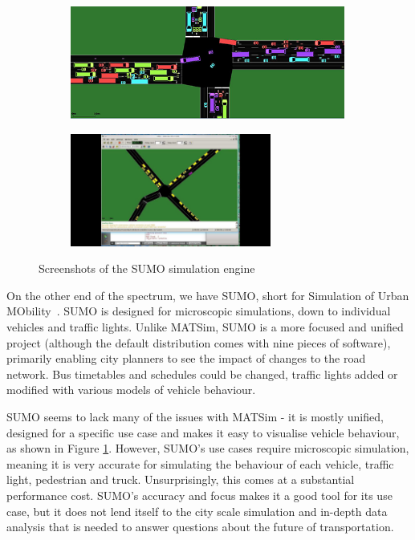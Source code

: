 \documentclass[ %
                    author={Alexander Hill},
                supervisor={Dr. Benjamin Sach},
                    degree={MEng},
                     title={MARMOSET},
                  subtitle={Multi-Agent Route Management using Online Simulation for Efficient Transportation},
                      type={research},
                      year={2016} ]{dissertation}
\begin{document}
\begin{figure}[h]
    \centering
    \begin{subfigure}[b]{0.45\textwidth}
        \centering
        \includegraphics[height=10em]{sumo-1}
    \end{subfigure}
    \hspace{1em}
    \begin{subfigure}[b]{0.45\textwidth}
        \centering
        \includegraphics[height=10em,clip,trim=7cm 0 7cm 0]{sumo-2}
    \end{subfigure}
    \caption{Screenshots of the SUMO simulation engine}\label{fig:sumo}
\end{figure}

On the other end of the spectrum, we have SUMO, short for Simulation of Urban
MObility~\cite{sumo}. SUMO is designed for microscopic simulations, down to
individual vehicles and traffic lights. Unlike MATSim, SUMO is a more focused
and unified project (although the default distribution comes with nine pieces of
software), primarily enabling city planners to see the impact of changes to the
road network. Bus timetables and schedules could be changed, traffic lights
added or modified with various models of vehicle behaviour.

SUMO seems to lack many of the issues with MATSim - it is mostly unified,
designed for a specific use case and makes it easy to visualise vehicle
behaviour, as shown in Figure \ref{fig:sumo}. However, SUMO's use cases require
microscopic simulation, meaning it is very accurate for simulating the behaviour
of each vehicle, traffic light, pedestrian and truck. Unsurprisingly, this comes
at a substantial performance cost. SUMO's accuracy and focus makes it a good
tool for its use case, but it does not lend itself to the city scale simulation
and in-depth data analysis that is needed to answer questions about the future
of transportation.
\end{document}
